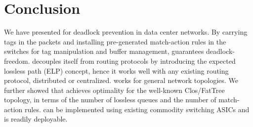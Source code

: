 \section{Conclusion}\label{sec:conclusion}
We have presented \sysname{}  for deadlock prevention in data center
networks. By carrying tags in the packets and installing pre-generated
match-action rules in the switches for tag manipulation and buffer
management, \sysname{}  guarantees deadlock-freedom. \sysname{} decouples
itself from routing protocols by introducing the expected lossless path
(ELP) concept, hence it works well with any existing routing protocol,
distributed or centralized. \sysname{}  works for general network
topologies. We further showed that \sysname{}  achieves optimality for
the well-known Clos/FatTree topology, in terms of the number of lossless queues and
the number of match-action rules. \sysname{}  can be implemented using
existing commodity switching ASICs and is readily deployable.
